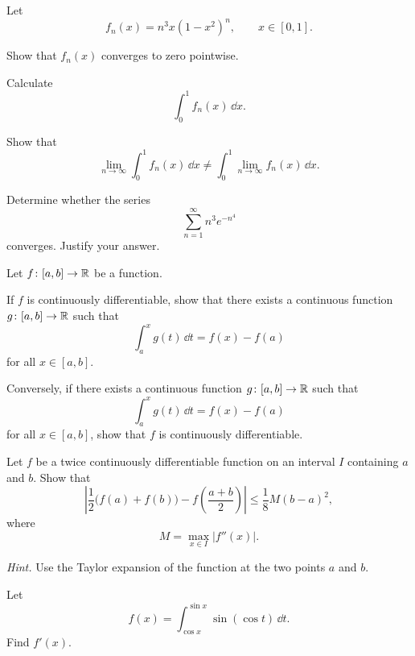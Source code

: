 \begin{problem}
Let
\[
f_n(x)=n^3x(1-x^2)^n,
\qquad x\in[0,1].
\]
\begin{problemsubparts}
\item Show that $f_n(x)$ converges to zero pointwise.
\item Calculate
\[
\int_0^1 f_n(x)\,\dd x.
\]
\item Show that
\[
\lim_{n\to\infty}\int_0^1 f_n(x)\,\dd x
\ne
\int_0^1\lim_{n\to\infty}f_n(x)\,\dd x.
\]
\end{problemsubparts}
\end{problem}

\begin{problem}
Determine whether the series
\[
\sum_{n=1}^{\infty} n^3e^{-n^4}
\]
converges. Justify your answer.
\end{problem}

\begin{problem}
Let $f\colon[a,b]\to\mathbb{R}$ be a function.
\begin{problemsubparts}
\item If $f$ is continuously differentiable, show that there exists a continuous function $g\colon[a,b]\to\mathbb{R}$ such that
\[
\int_a^x g(t)\,\dd t=f(x)-f(a)
\]
for all $x\in[a,b]$.
\item Conversely, if there exists a continuous function $g\colon[a,b]\to\mathbb{R}$ such that
\[
\int_a^x g(t)\,\dd t=f(x)-f(a)
\]
for all $x\in[a,b]$, show that $f$ is continuously differentiable.
\end{problemsubparts}
\end{problem}

\begin{problem}
Let $f$ be a twice continuously differentiable function on an interval $I$ containing $a$ and $b$. Show that
\[
\left|
\frac12\bigl(f(a)+f(b)\bigr)-f\!\left(\frac{a+b}{2}\right)
\right|
\le
\frac18 M(b-a)^2,
\]
where
\[
M=\max_{x\in I}|f''(x)|.
\]

\textit{Hint.} Use the Taylor expansion of the function at the two points $a$ and $b$.
\end{problem}

\begin{problem}
Let
\[
f(x)=\int_{\cos x}^{\sin x}\sin(\cos t)\,\dd t.
\]
Find $f'(x)$.
\end{problem}

